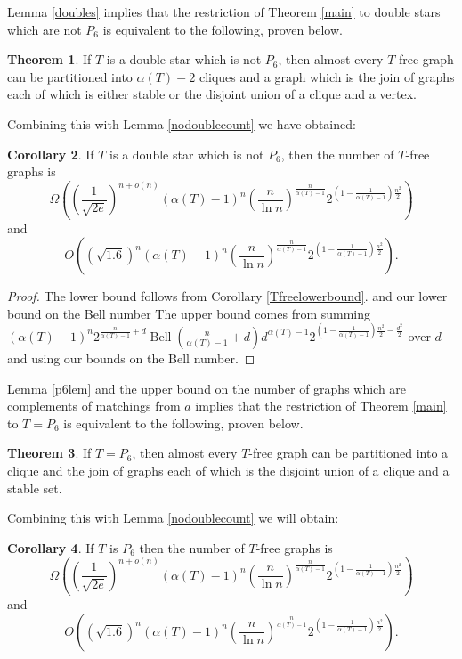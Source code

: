 \documentclass[12pt]{article}
\theoremstyle{definition}
\newtheorem{theorem}{Theorem}[section]
\newtheorem{corollary}[theorem]{Corollary}
\DeclareMathOperator{\Bell}{Bell}
\begin{document}
Lemma \ref{doubles} implies that the restriction of Theorem \ref{main}
to double stars which are not $P_6$  is   equivalent to the following, proven below. 



\begin{theorem}
\label{tss}
If $T$ is  a double star  which is not $P_6$,  then almost every $T$-free graph can be partitioned into 
$\alpha(T)-2$ cliques and a graph which is  the join of graphs each of which is either stable  or the disjoint union 
of a clique  and a vertex.    
\end{theorem}

Combining this with Lemma \ref{nodoublecount} we have obtained: 


\begin{corollary}
\label{cnpm}
    If $T$ is  a double star  which is not $P_6$,  then the number of $T$-free graphs is 
    $$\Omega((\frac{1}{\sqrt{2e}})^{n+o(n)}(\alpha(T)-1)^n(\frac{n}{\ln n})^\frac{n}{\alpha(T)-1}2^{(1-\frac{1}{\alpha(T)-1})\frac{n^2}{2}})$$ and 
    $$O(({\sqrt{1.6}})^{n}(\alpha(T)-1)^n(\frac{n}{\ln n})^\frac{n}{\alpha(T)-1}2^{(1-\frac{1}{\alpha(T)-1})\frac{n^2}{2}}).$$ 
\end{corollary}

\begin{proof}
The lower bound follows from Corollary \ref{Tfreelowerbound}. and our lower bound on the Bell number 
The upper bound comes from summing $(\alpha(T)-1)^n2^{\frac{n}{\alpha(T)-1}+d}\Bell(\frac{n}{\alpha(T)-1}+d)d^{\alpha(T)-1}2^{(1-\frac{1}{\alpha(T)-1})\frac{n^2}{2}-\frac{d^2}{2}}$
over $d$ 
and using our bounds on the Bell number. 
\end{proof}


Lemma \ref{p6lem} and the upper bound on the number of graphs which are complements of matchings from $a$ implies that the restriction of Theorem \ref{main}
to $T =P_6$  is   equivalent to the following, proven below. 



\begin{theorem}
\label{tss}
If $T =P_6$,  then almost every $T$-free graph can be partitioned into 
a  clique and the join of graphs each of which is the disjoint union of a clique and a stable set.    
\end{theorem}

Combining this with Lemma \ref{nodoublecount} we will obtain: 


\begin{corollary}
\label{cnpm}
    If $T$ is  $P_6$   then the number of $T$-free graphs is
    $$\Omega\left((\frac{1}{\sqrt{2e}})^{n+o(n)}(\alpha(T)-1)^n(\frac{n}{\ln n})^\frac{n}{\alpha(T)-1}2^{(1-\frac{1}{\alpha(T)-1})\frac{n^2}{2}}\right)$$ and 
    $$O\left(({\sqrt{1.6}})^{n}(\alpha(T)-1)^n(\frac{n}{\ln n})^\frac{n}{\alpha(T)-1}2^{(1-\frac{1}{\alpha(T)-1})\frac{n^2}{2}}\right).$$  
\end{corollary}
\end{document}
